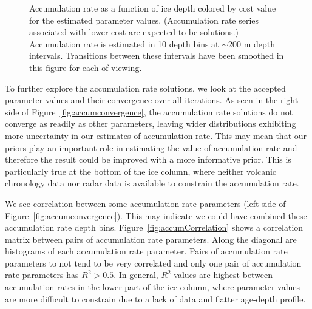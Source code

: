 \begin{figure}[ht]
\centering
{}
\caption[]{Accumulation rate as a function of ice depth colored by cost value for the estimated parameter values. (Accumulation rate series associated with lower cost are expected to be solutions.) Accumulation rate is estimated in 10 depth bins at $\sim$200 m depth intervals. Transitions between these intervals have been smoothed in this figure for each of viewing.}
\label{fig:accumdepth}
\end{figure}

To further explore the accumulation rate solutions, we look at the accepted parameter values and their convergence over all iterations. As seen in the right side of Figure~\ref{fig:accumconvergence}, the accumulation rate solutions do not converge as readily as other parameters, leaving wider distributions exhibiting more uncertainty in our estimates of accumulation rate. This may mean that our priors play an important role in estimating the value of accumulation rate and therefore the result could be improved with a more informative prior. This is particularly true at the bottom of the ice column, where neither volcanic chronology data nor radar data is available to constrain the accumulation rate.

We see correlation between some accumulation rate parameters (left side of Figure~\ref{fig:accumconvergence}). This may indicate we could have combined these accumulation rate depth bins. Figure~\ref{fig:accumCorrelation} shows a correlation matrix between pairs of accumulation rate parameters. Along the diagonal are histograms of each accumulation rate parameter. Pairs of accumulation rate parameters to not tend to be very correlated and only one pair of accumulation rate parameters has $R^2 > 0.5$. In general, $R^2$ values are highest between accumulation rates in the lower part of the ice column, where parameter values are more difficult to constrain due to a lack of data and flatter age-depth profile.


